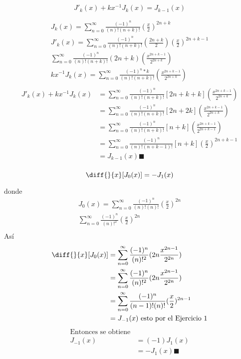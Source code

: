 \begin{prob}
     $$J'_{k}(x) + kx^{-1}J_{k}(x) = J_{k-1}(x)$$
\end{prob}
\begin{mdframed}
\begin{gather*}
    J_{k}(x) =\sum_{n=0}^\infty \frac{(-1)^n}{(n)!(n+k)!}(\frac{x}{2})^{2n+k}\\
    J'_{k}(x) =\sum_{n=0}^\infty \frac{(-1)^n}{(n)!(n+k)!}(\frac{2n+k}{2})(\frac{x}{2})^{2n+k-1}\\
    \sum_{n=0}^\infty \frac{(-1)^n}{(n)!(n+k)!}({2n+k})(\frac{x^{2n+k-1}}{2^{2n+k}})\\
    kx^{-1}J_{k}(x) =\sum_{n=0}^\infty \frac{(-1)^n*k}{(n)!(n+k)!}(\frac{x^{2n+k-1}}{2^{2n+k}})\\
\end{gather*}
\begin{align*}
    J'_{k}(x) + kx^{-1}J_{k}(x)& = \sum_{n=0}^\infty \frac{(-1)^n}{(n)!(n+k)!}[2n+k+k](\frac{x^{2n+k-1}}{2^{2n+k}})\\
    & = \sum_{n=0}^\infty \frac{(-1)^n}{(n)!(n+k)!}[2n+2k](\frac{x^{2n+k-1}}{2^{2n+k}})\\
    & = \sum_{n=0}^\infty \frac{(-1)^n}{(n)!(n+k)!}[n+k](\frac{x^{2n+k-1}}{2^{2n+k-1}})\\
    & = \sum_{n=0}^\infty \frac{(-1)^n}{(n)!(n+k-1)!}[n+k](\frac{x}{2})^{2n+k-1}\\
    & = J_{k-1}(x)\blacksquare\\
\end{align*}
\end{mdframed}
\begin{prob}
     $$\diff{}{x}[J_{0}(x)] = -J_{1}(x)$$
\end{prob}
\begin{mdframed}
 donde 
 \begin{gather*}
    J_{0}(x) =\sum_{n=0}^\infty \frac{(-1)^n}{(n)!(n)!}(\frac{x}{2})^{2n}\\
    \sum_{n=0}^\infty \frac{(-1)^n}{(n)!^2}(\frac{x}{2})^{2n}\\
 \end{gather*}
 Así 
 \begin{align*}
      \diff{}{x}[J_{0}(x)] & = \sum_{n=0}^\infty \frac{(-1)^n}{(n)!^2}(2n\frac{x^{2n-1}}{2^{2n}})\\
      & = \sum_{n=0}^\infty \frac{(-1)^n}{(n)!^2}(2n\frac{x^{2n-1}}{2^{2n}})\\
      & = \sum_{n=0}^\infty \frac{(-1)^n}{(n-1)!(n)!}(\frac{x}{2})^{2n-1}\\
      & = J_{-1}(x) \text{  esto por el Ejercicio 1}\\
 \end{align*}
 \begin{align*}
     \text{Entonces se obtiene}\\
     J_{-1}(x) & = (-1)J_{1}(x)\\
      & = -J_{1}(x) \blacksquare\\
 \end{align*}
\end{mdframed}


